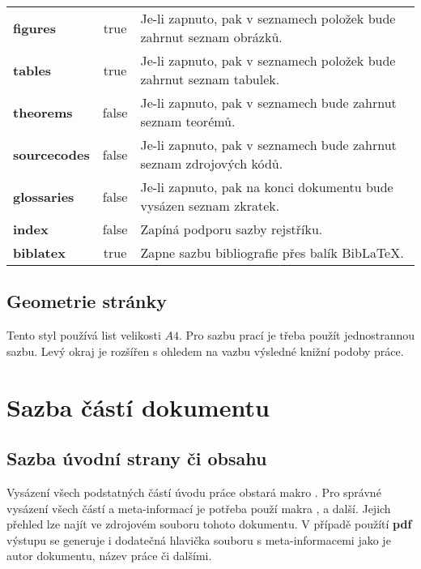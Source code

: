 \documentclass[
  master=false,               %
  font=sans,                  %
  printversion=false,         %
  joinlists=true,             %
  glossaries=true,            %
  figures=true,               %
  tables=true,                %
  sourcecodes=true,					  %
  theorems=true,						  %
  bibencoding=utf8,           %
  language=czech,             %
  encoding=utf8,              %
  field=inf,                  %
  index=true,                 %
  biblatex=true               %
]{updiplom}
\begin{document}
\begin{table}
\begin{center}
{\begin{tabular}{>{\bfseries}l >{\ttfamily}c L{8cm}}
figures & true & Je-li zapnuto, pak v seznamech položek bude zahrnut seznam obrázků. \\

tables & true & Je-li zapnuto, pak v seznamech položek bude zahrnut seznam tabulek. \\

theorems & false & Je-li zapnuto, pak v seznamech bude zahrnut seznam teorémů. \\

sourcecodes & false & Je-li zapnuto, pak v seznamech bude zahrnut seznam zdrojových kódů. \\

glossaries & false & Je-li zapnuto, pak na konci dokumentu bude vysázen seznam zkratek. \\

index & false & Zapíná podporu sazby rejstříku. \\

biblatex & true & Zapne sazbu bibliografie přes balík Bib\LaTeX{}.
\end{tabular}}
\end{center}
\end{table}

\subsection{Geometrie stránky}
Tento styl používá list velikosti $A4$. Pro sazbu prací je třeba použít jednostrannou sazbu. Levý okraj je rozšířen s ohledem na vazbu výsledné knižní podoby práce.

\section{Sazba částí dokumentu}
\subsection{Sazba úvodní strany či obsahu}
Vysázení všech podstatných částí úvodu práce obstará makro . Pro správné vysázení všech částí a meta-informací je potřeba použí makra ,  a další. Jejich přehled lze najít ve zdrojovém souboru tohoto dokumentu. V případě použítí \textbf{pdf} výstupu se generuje i dodatečná hlavička souboru s meta-informacemi jako je autor dokumentu, název práce či dalšími.
\end{document}
